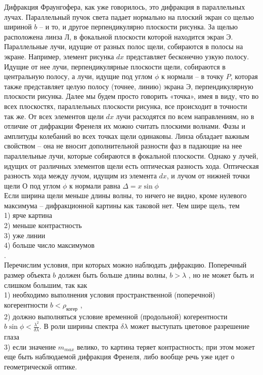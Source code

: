 Дифракция Фраунгофера, как уже говорилось, это дифракция в параллельных лучах. Параллельный пучок света падает нормально на плоский экран со щелью шириной $b$ – и то, и другое перпендикулярно плоскости рисунка. За щелью расположена линза Л, в фокальной плоскости которой находится экран Э. Параллельные лучи, идущие от разных полос щели, собираются в полосы на экране. Например, элемент рисунка $dx$ представляет бесконечно узкую полосу. Идущие от нее лучи, перпендикулярные плоскости щели, собираются в центральную полосу, а лучи, идущие под углом $\phi$ к нормали – в точку $P$, которая также представляет целую полосу (точнее, линию) экрана Э, перпендикулярную плоскости рисунка. Далее мы будем просто говорить «точка», имея в виду, что во всех плоскостях, параллельных плоскости рисунка, все происходит в точности так же.
От всех элементов щели $dx$ лучи расходятся по всем направлениям, но в отличие от дифракции Френеля их можно считать плоскими волнами. Фазы и амплитуды колебаний во всех точках щели одинаковы.
Линза обладает важным свойством – она не вносит дополнительной разности фаз в падающие на нее параллельные лучи, которые собираются в фокальной
плоскости. Однако у лучей, идущих от различных элементов щели есть оптическая разность хода. Оптическая разность хода между лучом, идущим из элемента $dx$, и лучом от нижней точки щели О под углом $\phi$ к нормали равна $\Delta = x\sin\phi$\\
Если ширина щели меньше длины волны, то ничего не видно, кроме нулевого максимума – дифракционной картины как таковой нет.
Чем шире щель, тем\\
1) ярче картина\\
2) меньше контрастность\\
3) уже линии\\
4) больше число максимумов\\.
\\
Перечислим условия, при которых можно наблюдать дифракцию.
Поперечный размер объекта $b$ должен быть больше длины волны, $b > \lambda$ , но не может быть и слишком большим, так как\\
1) необходимо выполнения условия пространственной (поперечной) когерентности $b<\rho_{\text{когер}}$ ,\\
2) должно выполняться условие временной (продольной) когерентности $b\sin\phi < \frac{\lambda^2}{\delta \lambda}$. В роли ширины спектра $\delta\lambda$ может выступать цветовое разрешение глаза\\
3) если значение $m_{max}$ велико, то картина теряет контрастность; при этом может еще быть наблюдаемой дифракция Френеля, либо вообще речь уже
идет о геометрической оптике.
 
